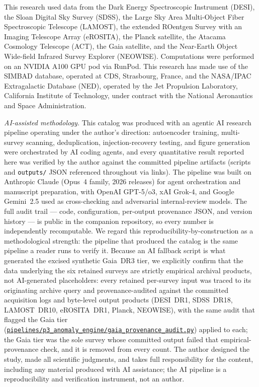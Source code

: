 \documentclass[aps,prd,twocolumn,superscriptaddress,showpacs,preprintnumbers,nofootinbib,longbibliography,floatfix]{revtex4-2}
\newcommand{\repoBase}{https://github.com/Hubify-Projects/bigbounce/blob/main}
\newcommand{\artifact}[1]{\href{\repoBase/#1}{\nolinkurl{#1}}}
\begin{document}
\begin{acknowledgments}
This research used data from the Dark Energy Spectroscopic Instrument (DESI), the Sloan Digital Sky Survey (SDSS), the Large Sky Area Multi-Object Fiber Spectroscopic Telescope (LAMOST), the extended ROentgen Survey with an Imaging Telescope Array (eROSITA), the Planck satellite, the Atacama Cosmology Telescope (ACT), the Gaia satellite, and the Near-Earth Object Wide-field Infrared Survey Explorer (NEOWISE). Computations were performed on an NVIDIA A100 GPU pod via RunPod. This research has made use of the SIMBAD database, operated at CDS, Strasbourg, France, and the NASA/IPAC Extragalactic Database (NED), operated by the Jet Propulsion Laboratory, California Institute of Technology, under contract with the National Aeronautics and Space Administration.

\textit{AI-assisted methodology.} This catalog was produced with an agentic AI research pipeline operating under the author's direction: autoencoder training, multi-survey scanning, deduplication, injection-recovery testing, and figure generation were orchestrated by AI coding agents, and every quantitative result reported here was verified by the author against the committed pipeline artifacts (scripts and \texttt{outputs/} JSON referenced throughout via \artifact{} links). The pipeline was built on Anthropic Claude (Opus~4 family, 2026 releases) for agent orchestration and manuscript preparation, with OpenAI GPT-5/o3, xAI Grok-4, and Google Gemini~2.5 used as cross-checking and adversarial internal-review models. The full audit trail --- code, configuration, per-output provenance JSON, and version history --- is public in the companion repository, so every number is independently recomputable. We regard this reproducibility-by-construction as a methodological strength: the pipeline that produced the catalog is the same pipeline a reader runs to verify it. Because an AI fallback script is what generated the excised synthetic Gaia~DR3 tier, we explicitly confirm that the data underlying the six retained surveys are strictly empirical archival products, not AI-generated placeholders: every retained per-survey input was traced to its originating archive query and provenance-audited against the committed acquisition logs and byte-level output products (DESI~DR1, SDSS~DR18, LAMOST~DR10, eROSITA~DR1, Planck, NEOWISE), with the same audit that flagged the Gaia tier (\artifact{pipelines/p3\_anomaly\_engine/gaia\_provenance\_audit.py}) applied to each; the Gaia tier was the sole survey whose committed output failed that empirical-provenance check, and it is removed from every count. The author designed the study, made all scientific judgments, and takes full responsibility for the content, including any material produced with AI assistance; the AI pipeline is a reproducibility and verification instrument, not an author.


\end{acknowledgments}
\end{document}
